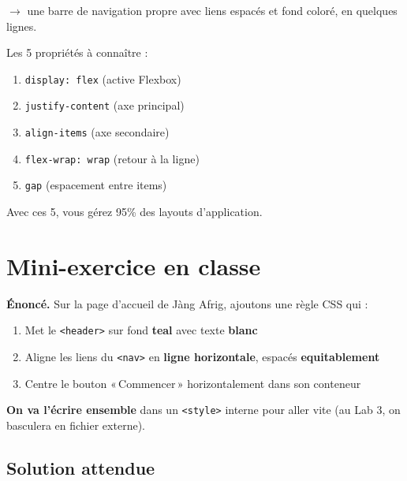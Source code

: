 \documentclass[11pt,a4paper]{article}
\begin{document}
$\to$ une barre de navigation propre avec liens espacés et fond coloré, en
quelques lignes.

\begin{retenirbox}
Les 5 propriétés à connaître :
\begin{enumerate}[nosep]
    \item \texttt{display: flex} \quad (active Flexbox)
    \item \texttt{justify-content} \quad (axe principal)
    \item \texttt{align-items} \quad (axe secondaire)
    \item \texttt{flex-wrap: wrap} \quad (retour à la ligne)
    \item \texttt{gap} \quad (espacement entre items)
\end{enumerate}
Avec ces 5, vous gérez 95\% des layouts d'application.
\end{retenirbox}

\newpage

\section{Mini-exercice en classe}

\begin{objectifbox}

\textbf{Énoncé.} Sur la page d'accueil de Jàng Afrig, ajoutons une règle
CSS qui :
\begin{enumerate}[nosep]
    \item Met le \texttt{<header>} sur fond \textbf{teal} avec texte \textbf{blanc}
    \item Aligne les liens du \texttt{<nav>} en \textbf{ligne horizontale}, espacés \textbf{equitablement}
    \item Centre le bouton «\,Commencer\,» horizontalement dans son conteneur
\end{enumerate}

\medskip

\textbf{On va l'écrire ensemble} dans un \texttt{<style>} interne pour
aller vite (au Lab 3, on basculera en fichier externe).
\end{objectifbox}

\subsection{Solution attendue}
\end{document}
